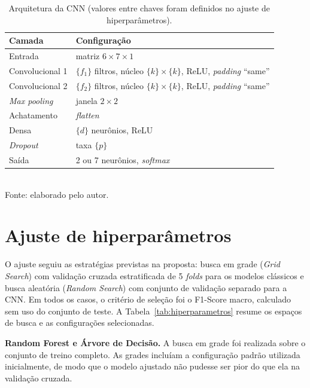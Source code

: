 \begin{table}[htbp]
\centering
\caption{Arquitetura da CNN (valores entre chaves foram definidos no ajuste de hiperparâmetros).}
\label{tab:cnn}
\begin{tabular}{ll}
\toprule
\textbf{Camada} & \textbf{Configuração} \\
\midrule
Entrada              & matriz $6 \times 7 \times 1$ \\
Convolucional 1      & $\{f_1\}$ filtros, núcleo $\{k\} \times \{k\}$, ReLU, \textit{padding} ``same'' \\
Convolucional 2      & $\{f_2\}$ filtros, núcleo $\{k\} \times \{k\}$, ReLU, \textit{padding} ``same'' \\
\textit{Max pooling} & janela $2 \times 2$ \\
Achatamento          & \textit{flatten} \\
Densa                & $\{d\}$ neurônios, ReLU \\
\textit{Dropout}     & taxa $\{p\}$ \\
Saída                & 2 ou 7 neurônios, \textit{softmax} \\
\bottomrule
\end{tabular}
\\[2pt]
\small{Fonte: elaborado pelo autor.}
\end{table}

\section{Ajuste de hiperparâmetros}
\label{sec:hiperparametros}

O ajuste seguiu as estratégias previstas na proposta: busca em grade (\textit{Grid Search}) com validação cruzada estratificada de 5 \textit{folds} para os modelos clássicos e busca aleatória (\textit{Random Search}) com conjunto de validação separado para a CNN. Em todos os casos, o critério de seleção foi o F1-Score macro, calculado sem uso do conjunto de teste. A Tabela~\ref{tab:hiperparametros} resume os espaços de busca e as configurações selecionadas.

\textbf{Random Forest e Árvore de Decisão.} A busca em grade foi realizada sobre o conjunto de treino completo. As grades incluíam a configuração padrão utilizada inicialmente, de modo que o modelo ajustado não pudesse ser pior do que ela na validação cruzada.

